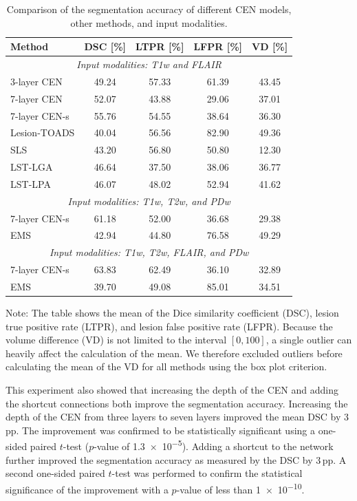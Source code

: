 \begin{table}
\begin{center}
\caption{Comparison of the segmentation accuracy of different CEN models, other
methods, and input modalities.}
\label{tab:results1}
\begin{tabular}{@{}lcccc@{}}
\toprule
Method & DSC [\%] & LTPR [\%] & LFPR [\%] & VD [\%] \\
\midrule
\multicolumn{5}{c}{\textit{Input modalities: T1w and FLAIR}} \\
\midrule
3-layer CEN \cite{brosch2015} & 49.24 & 57.33 & 61.39 & 43.45 \\
7-layer CEN & 52.07 & 43.88 & 29.06 & 37.01 \\ 
7-layer CEN-s & 55.76 & 54.55 & 38.64 & 36.30 \\[0.2em]
Lesion-TOADS \cite{shiee2010topology} & 40.04 & 56.56 & 82.90 & 49.36 \\ 
SLS \cite{roura2015}  & 43.20 &  56.80 & 50.80 & 12.30 \\
LST-LGA \cite{schmidt2012automated} & 46.64 & 37.50 & 38.06 & 36.77 \\
LST-LPA \cite{schmidt2012automated} & 46.07 & 48.02 & 52.94 & 41.62 \\
\midrule
\multicolumn{5}{c}{\textit{Input modalities: T1w, T2w, and PDw}} \\
\midrule
7-layer CEN-s & 61.18 & 52.00 & 36.68 & 29.38 \\
EMS \cite{vanleemput2001} & 42.94 & 44.80 & 76.58 & 49.29 \\
\midrule
\multicolumn{5}{c}{\textit{Input modalities: T1w, T2w, FLAIR, and PDw}} \\
\midrule
7-layer CEN-s & 63.83 & 62.49 & 36.10 & 32.89 \\
EMS \cite{vanleemput2001} & 39.70 & 49.08 & 85.01 & 34.51 \\
\bottomrule
\end{tabular}
\end{center}
Note: The table shows the mean of the Dice similarity coefficient (DSC), lesion
true positive rate (LTPR), and lesion false positive rate (LFPR). Because
the volume difference (VD) is not limited to the interval $[0, 100]$, a
single outlier can heavily affect the calculation of the mean. We therefore
excluded outliers before calculating the mean of the VD for all methods using
the box plot criterion.
\end{table}

This experiment also showed that increasing the depth of the CEN
and adding the shortcut connections both improve the segmentation accuracy.
Increasing the depth of the CEN from three layers to seven layers improved the
mean DSC by 3\,pp. The improvement was confirmed to be statistically
significant using a one-sided paired $t$-test ($p$-value of \num{1.3e-5}).
Adding a shortcut to the network further improved the segmentation
accuracy as measured by the DSC by 3\,pp. A second one-sided paired $t$-test
was performed to confirm the statistical significance of the improvement with a
$p$-value of less than \num{1e-10}.

